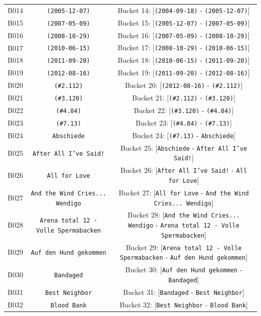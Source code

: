\documentclass[11pt,a4paper]{article}
\begin{document}
{\begin{xltabular}{\textwidth}{l | C | C}
B014 & \texttt{(2005-12-07)} & Bucket 14: [\texttt{(2004-09-18)} - \texttt{(2005-12-07)}] \\
B015 & \texttt{(2007-05-09)} & Bucket 15: [\texttt{(2005-12-07)} - \texttt{(2007-05-09)}] \\
B016 & \texttt{(2008-10-29)} & Bucket 16: [\texttt{(2007-05-09)} - \texttt{(2008-10-29)}] \\
B017 & \texttt{(2010-06-15)} & Bucket 17: [\texttt{(2008-10-29)} - \texttt{(2010-06-15)}] \\
B018 & \texttt{(2011-09-20)} & Bucket 18: [\texttt{(2010-06-15)} - \texttt{(2011-09-20)}] \\
B019 & \texttt{(2012-08-16)} & Bucket 19: [\texttt{(2011-09-20)} - \texttt{(2012-08-16)}] \\
B020 & \texttt{(\#2.112)} & Bucket 20: [\texttt{(2012-08-16)} - \texttt{(\#2.112)}] \\
B021 & \texttt{(\#3.120)} & Bucket 21: [\texttt{(\#2.112)} - \texttt{(\#3.120)}] \\
B022 & \texttt{(\#4.84)} & Bucket 22: [\texttt{(\#3.120)} - \texttt{(\#4.84)}] \\
B023 & \texttt{(\#7.13)} & Bucket 23: [\texttt{(\#4.84)} - \texttt{(\#7.13)}] \\
B024 & \texttt{Abschiede} & Bucket 24: [\texttt{(\#7.13)} - \texttt{Abschiede}] \\
B025 & \texttt{After All I've Said!} & Bucket 25: [\texttt{Abschiede} - \texttt{After All I've Said!}] \\
B026 & \texttt{All for Love} & Bucket 26: [\texttt{After All I've Said!} - \texttt{All for Love}] \\
B027 & \texttt{And the Wind Cries... Wendigo} & Bucket 27: [\texttt{All for Love} - \texttt{And the Wind Cries... Wendigo}] \\
B028 & \texttt{Arena total 12 - Volle Spermabacken} & Bucket 28: [\texttt{And the Wind Cries... Wendigo} - \texttt{Arena total 12 - Volle Spermabacken}] \\
B029 & \texttt{Auf den Hund gekommen} & Bucket 29: [\texttt{Arena total 12 - Volle Spermabacken} - \texttt{Auf den Hund gekommen}] \\
B030 & \texttt{Bandaged} & Bucket 30: [\texttt{Auf den Hund gekommen} - \texttt{Bandaged}] \\
B031 & \texttt{Best Neighbor} & Bucket 31: [\texttt{Bandaged} - \texttt{Best Neighbor}] \\
B032 & \texttt{Blood Bank} & Bucket 32: [\texttt{Best Neighbor} - \texttt{Blood Bank}] \\

\end{xltabular}}
\end{document}
